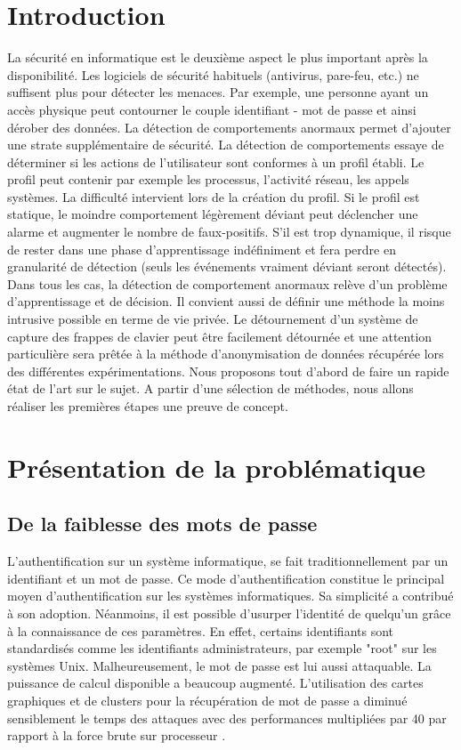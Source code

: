 \documentclass[conference,compsoc]{IEEEtran}
\begin{document}
\section{Introduction}
La sécurité en informatique est le deuxième aspect le plus important après la disponibilité. Les logiciels de sécurité habituels (antivirus, pare-feu, etc.) ne suffisent plus pour détecter les menaces. Par exemple, une personne ayant un accès physique peut contourner le couple identifiant - mot de passe et ainsi dérober des données. La détection de comportements anormaux permet d'ajouter une strate supplémentaire de sécurité. La détection de comportements essaye de déterminer si les actions de l'utilisateur sont conformes à un profil établi. Le profil peut contenir par exemple les processus, l'activité réseau, les appels systèmes. La difficulté intervient lors de la création du profil. Si le profil est statique, le moindre comportement légèrement déviant peut déclencher une alarme et augmenter le nombre de faux-positifs. S'il est trop dynamique, il risque de rester dans une phase d'apprentissage indéfiniment et fera perdre en granularité de détection (seuls les événements vraiment déviant seront détectés). Dans tous les cas, la détection de comportement anormaux relève d'un problème d'apprentissage et de décision. Il convient aussi de définir une méthode la moins intrusive possible en terme de vie privée. Le détournement d'un système de capture des frappes de clavier peut être facilement détournée et une attention particulière sera prêtée à la méthode d'anonymisation de données récupérée lors des différentes expérimentations. Nous proposons tout d'abord de faire un rapide état de l'art sur le sujet. A partir d'une sélection de méthodes, nous allons réaliser les premières étapes une preuve de concept.

\section{Présentation de la problématique}

\subsection{De la faiblesse des mots de passe}

L'authentification sur un système informatique, se fait traditionnellement par un identifiant et un mot de passe. Ce mode d'authentification constitue le principal moyen d'authentification sur les systèmes informatiques. Sa simplicité a contribué à son adoption. Néanmoins, il est possible d'usurper l'identité de quelqu'un grâce à la connaissance de ces paramètres. En effet, certains identifiants sont standardisés comme les identifiants administrateurs, par exemple "root" sur les systèmes Unix. Malheureusement, le mot de passe est lui aussi attaquable. La puissance de calcul disponible a beaucoup augmenté. L'utilisation des cartes graphiques et de clusters pour la récupération de mot de passe a diminué sensiblement le temps des attaques avec des performances multipliées par 40 par rapport à la force brute sur processeur \cite{6507505}.
\end{document}
